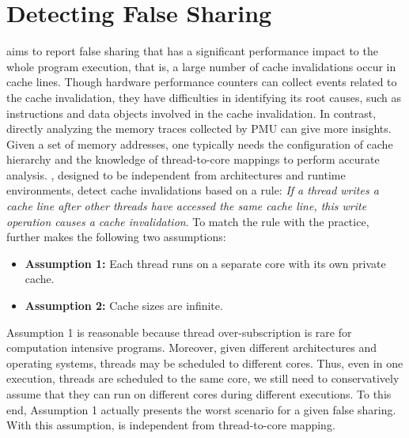 \section{Detecting False Sharing}
\label{sec:detect}

\cheetah{} aims to report false sharing that has a significant performance impact to the whole program execution, that is, a large number of cache invalidations occur in cache lines. Though hardware performance counters can collect events related to the cache invalidation, they have difficulties in identifying its root causes, such as instructions and data objects involved in the cache invalidation. In contrast, directly analyzing the memory traces collected by PMU can give more insights. Given a set of memory addresses, one typically needs the configuration of cache hierarchy and the knowledge of thread-to-core mappings to perform accurate analysis. 
\cheetah{}, designed to be independent from architectures and runtime environments, detect cache invalidations based on a rule: \emph{If a thread writes a cache line after other threads have accessed the same cache line, this write operation causes a cache invalidation}. To match the rule with the practice, \cheetah{} further makes the following two assumptions:
\begin{itemize} 
\item {\bf Assumption 1:} Each thread runs on a separate core with its own private cache. 

\item {\bf Assumption 2: } Cache sizes are infinite. 
 
\end{itemize}

Assumption 1 is reasonable because thread over-subscription is rare for computation intensive programs. Moreover, given different architectures and operating systems, threads may be scheduled to different cores. Thus, even in one execution, threads are scheduled to the same core, we still need to conservatively assume that they can run on different cores during different executions.
To this end, Assumption 1 actually presents the worst scenario for a given false sharing. 
With this assumption, \cheetah{} is independent from thread-to-core mapping.

